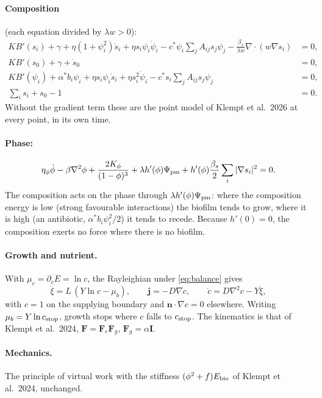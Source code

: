 \documentclass[11pt,a4paper]{article}
\begin{document}
\paragraph{Composition} (each equation divided by $\lambda w>0$):
\begin{align}
KB'(s_i)+\gamma+\eta(1+\psi_i^2)\dot s_i+\eta s_i\psi_i\dot\psi_i-c^*\psi_i\sum_jA_{ij}s_j\psi_j
-\frac{\beta_s}{\lambda w}\nabla\!\cdot(w\nabla s_i)&=0,\label{eq:s}\\
KB'(s_0)+\gamma+\dot s_0&=0,\\
KB'(\psi_i)+\alpha^*b_i\psi_i+\eta s_i\psi_i\dot s_i+\eta s_i^2\dot\psi_i-c^*s_i\sum_jA_{ij}s_j\psi_j&=0,\label{eq:psi}\\
\textstyle\sum_is_i+s_0-1&=0 .
\end{align}
Without the gradient term these are the point model of Klempt et al.\ 2026 at every point, in
its own time.

\paragraph{Phase:}
\begin{equation}
\eta_\phi\dot\phi-\beta\nabla^2\phi+\frac{2K_\phi}{(1-\phi)^3}
+\lambda h'(\phi)\Psi_{\rm pm}+h'(\phi)\frac{\beta_s}{2}\sum_i|\nabla s_i|^2=0 .
\label{eq:phi}
\end{equation}
The composition acts on the phase through $\lambda h'(\phi)\Psi_{\rm pm}$: where the
composition energy is low (strong favourable interactions) the biofilm tends to grow, where it
is high (an antibiotic, $\alpha^*b_i\psi_i^2/2$) it tends to recede. Because $h'(0)=0$, the
composition exerts no force where there is no biofilm.

\paragraph{Growth and nutrient.} With $\mu_c=\partial_cE=\ln c$, the Rayleighian under
\eqref{eq:balance} gives
\begin{equation}
\dot\xi=L\,(Y\ln c-\mu_b),\qquad \mathbf j=-D\nabla c,\qquad
\dot c=D\nabla^2c-Y\dot\xi ,
\label{eq:growth}
\end{equation}
with $c=1$ on the supplying boundary and $\mathbf n\cdot\nabla c=0$ elsewhere. Writing
$\mu_b=Y\ln c_{\rm stop}$, growth stops where $c$ falls to $c_{\rm stop}$. The kinematics is
that of Klempt et al.\ 2024, $\mathbf F=\mathbf F_e\mathbf F_g$, $\mathbf F_g=\alpha\mathbf I$.

\paragraph{Mechanics.} The principle of virtual work with the stiffness
$(\phi^2+f)E_{\rm bio}$ of Klempt et al.\ 2024, unchanged.
\end{document}
